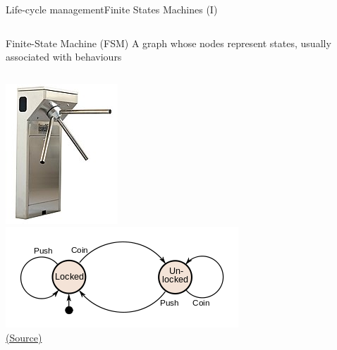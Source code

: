 \documentclass[10pt,compress]{beamer} %
\begin{document}
\begin{frame}{Life-cycle management}{Finite States Machines (I)}
	\begin{columns}
		\begin{block}{Finite-State Machine (FSM)}
	    	A graph whose nodes represent states, usually associated with behaviours
		\end{block}
	\end{columns}

	\bigskip

	\begin{columns}
 	   \column{.20\textwidth}
		\includegraphics[width=\linewidth]{figs/turnstile}\\
 	   \column{.50\textwidth}
		\includegraphics[width=\linewidth]{figs/fsm}\\
		\centering \tiny \href{https://en.wikipedia.org/wiki/Finite-state\_machine}{(Source)}
	\end{columns}
\end{frame}
\end{document}
